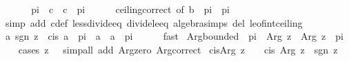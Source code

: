 \begin{isabellebody}
\ \ \isamarkupfalse%
\ \isamarkupfalse%
\ {\isachardoublequoteopen}{\isacharminus}{\kern0pt}\ pi\ {\isacharless}{\kern0pt}\ c\ {\isasymand}\ c\ {\isasymle}\ pi{\isachardoublequoteclose}\isanewline
\ \ \ \ \isamarkupfalse%
\ ceiling{\isacharunderscore}{\kern0pt}correct\ {\isacharbrackleft}{\kern0pt}of\ {\isachardoublequoteopen}{\isacharparenleft}{\kern0pt}b\ {\isacharminus}{\kern0pt}\ pi{\isacharparenright}{\kern0pt}\ {\isacharslash}{\kern0pt}\ {\isacharparenleft}{\kern0pt}{}{\isacharasterisk}{\kern0pt}pi{\isacharparenright}{\kern0pt}{\isachardoublequoteclose}{\isacharbrackright}{\kern0pt}\isanewline
\ \ \ \ \isamarkupfalse%
\ {\isacharparenleft}{\kern0pt}simp\ add{\isacharcolon}{\kern0pt}\ c{\isacharunderscore}{\kern0pt}def\ less{\isacharunderscore}{\kern0pt}divide{\isacharunderscore}{\kern0pt}eq\ divide{\isacharunderscore}{\kern0pt}le{\isacharunderscore}{\kern0pt}eq\ algebra{\isacharunderscore}{\kern0pt}simps\ del{\isacharcolon}{\kern0pt}\ le{\isacharunderscore}{\kern0pt}of{\isacharunderscore}{\kern0pt}int{\isacharunderscore}{\kern0pt}ceiling{\isacharparenright}{\kern0pt}\isanewline
\ \ \isamarkupfalse%
\ \isamarkupfalse%
\ {\isachardoublequoteopen}{\isasymexists}a{\isachardot}{\kern0pt}\ sgn\ z\ {\isacharequal}{\kern0pt}\ cis\ a\ {\isasymand}\ {\isacharminus}{\kern0pt}pi\ {\isacharless}{\kern0pt}\ a\ {\isasymand}\ a\ {\isasymle}\ pi{\isachardoublequoteclose}\isanewline
\ \ \ \ \isamarkupfalse%
\ fast\isanewline
{}\isamarkupfalse%
%
\endisatagproof
{\isafoldproof}%
%
\isadelimproof
\isanewline
%
\endisadelimproof
\isanewline
{}\isamarkupfalse%
\ Arg{\isacharunderscore}{\kern0pt}bounded{\isacharcolon}{\kern0pt}\ {\isachardoublequoteopen}{\isacharminus}{\kern0pt}\ pi\ {\isacharless}{\kern0pt}\ Arg\ z\ {\isasymand}\ Arg\ z\ {\isasymle}\ pi{\isachardoublequoteclose}\isanewline
%
\isadelimproof
\ \ %
\endisadelimproof
%
\isatagproof
{}\isamarkupfalse%
\ {\isacharparenleft}{\kern0pt}cases\ {\isachardoublequoteopen}z\ {\isacharequal}{\kern0pt}\ {}{\isachardoublequoteclose}{\isacharparenright}{\kern0pt}\ {\isacharparenleft}{\kern0pt}simp{\isacharunderscore}{\kern0pt}all\ add{\isacharcolon}{\kern0pt}\ Arg{\isacharunderscore}{\kern0pt}zero\ Arg{\isacharunderscore}{\kern0pt}correct{\isacharparenright}{\kern0pt}%
\endisatagproof
{\isafoldproof}%
%
\isadelimproof
\isanewline
%
\endisadelimproof
\isanewline
{}\isamarkupfalse%
\ cis{\isacharunderscore}{\kern0pt}Arg{\isacharcolon}{\kern0pt}\ {\isachardoublequoteopen}z\ {\isasymnoteq}\ {}\ {\isasymLongrightarrow}\ cis\ {\isacharparenleft}{\kern0pt}Arg\ z{\isacharparenright}{\kern0pt}\ {\isacharequal}{\kern0pt}\ sgn\ z{\isachardoublequoteclose}\isanewline

\end{isabellebody}
